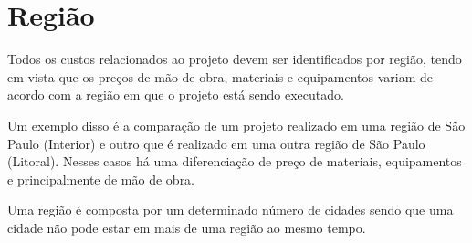\chapter{Região}

Todos os custos relacionados ao projeto devem ser identificados por região, tendo em vista que os preços de mão de obra, materiais e equipamentos variam de acordo com a região em que o projeto está sendo executado.

Um exemplo disso é a comparação de um projeto realizado em uma região de São Paulo (Interior) e outro que é realizado em uma outra região de São Paulo (Litoral). Nesses casos há uma diferenciação de preço de materiais, equipamentos e principalmente de mão de obra.

Uma região é composta por um determinado número de cidades sendo que uma cidade não pode estar em mais de uma região ao mesmo tempo.